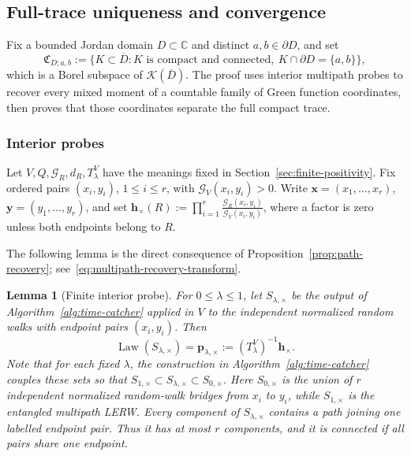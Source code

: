 \documentclass[11pt]{article}
\numberwithin{equation}{section}
\newcommand{\C}{\mathbb{C}}
\newcommand{\1}{\mathbf{1}}
\newtheorem{lemma}[theorem]{Lemma}
\newcommand\ol[1]{\overline{#1}}
\newcommand{\Gc}{\mathcal G}
\newcommand{\bp}{\mathbf p}
\newcommand{\bh}{\mathbf h}
\begin{document}
\subsection{Full-trace uniqueness and convergence}
\label{subsec:sec5-full-trace}

Fix a bounded Jordan domain \(D\subset\C\) and distinct
\(a,b\in\partial D\), and set
\begin{equation}\label{eq:sec5-continuum-state}
 \mathfrak C_{D;a,b}
 :=\{K\subset\ol D:K\text{ is compact and connected},\
 K\cap\partial D=\{a,b\}\},
\end{equation}
which is a Borel subspace of
\(\mathcal K(\ol D)\).
The proof uses interior multipath probes to recover every mixed moment of
a countable family of Green function coordinates, then proves that those
coordinates separate the full compact trace.

\subsubsection{Interior probes}
\label{subsec:sec5-internal-probes}

Let \(V,Q,\Gc_R,d_R,T_\lambda^V\) have the meanings fixed in
Section~\ref{sec:finite-positivity}.  Fix ordered pairs
\((x_i,y_i)\), \(1\leq i\leq r\), with \(\Gc_V(x_i,y_i)>0\).  Write
\(\mathbf x=(x_1,\ldots,x_r)\), \(\mathbf y=(y_1,\ldots,y_r)\), and set $\bh_\times(R)
 :=\prod_{i=1}^r\frac{\Gc_R(x_i,y_i)}{\Gc_V(x_i,y_i)}$,
where a factor is zero unless both endpoints belong to \(R\).


The following lemma is the direct consequence of Proposition~\ref{prop:path-recovery}; see~\eqref{eq:multipath-recovery-transform}.
\begin{lemma}[Finite interior probe]\label{lem:sec5-finite-probe}
For $0\leq\lambda\leq1$, let $S_{\lambda,\times}$ be the output of Algorithm~\ref{alg:time-catcher} applied in $V$ to the independent normalized random walks with endpoint pairs $(x_i,y_i)$.  Then
\[
 \operatorname{Law}(S_{\lambda,\times})
 =\bp_{\lambda,\times}:=(T_\lambda^V)^{-1}\bh_\times.
\]
Note that for each fixed $\lambda$, the construction in
Algorithm~\ref{alg:time-catcher} couples these sets so that
$S_{1,\times}\subset S_{\lambda,\times}\subset S_{0,\times}$.
Here $S_{0,\times}$ is the union of $r$ independent normalized random-walk
bridges from $x_i$ to $y_i$, while $S_{1,\times}$ is the entangled multipath
LERW.  Every component of $S_{\lambda,\times}$ contains a path joining one
labelled endpoint pair.  Thus it has at most $r$ components, and it is
connected if all pairs share one endpoint.
\end{lemma}
\end{document}
